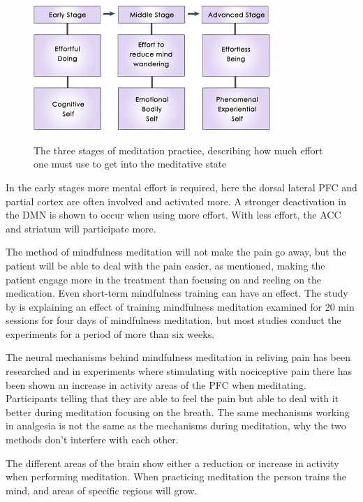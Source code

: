 \begin{figure}[H]
	\includegraphics[width=0.8\textwidth]{figures/stages_of_meditation.png} 
	\caption{The three stages of meditation practice, describing how much effort one must use to get into the meditative state}
	\label{fig:meditation_stages}  
	\cite{Tang2017}
\end{figure}  

In the early stages more mental effort is required, here the dorsal lateral PFC and partial cortex are often involved and activated more. A stronger deactivation in the DMN is shown to occur when using more effort. With less effort, the ACC and striatum will participate more. \cite{Tang2017}

The method of mindfulness meditation will not make the pain go away, but the patient will be able to deal with the pain easier, as mentioned, making the patient engage more in the treatment than focusing on and reeling on the medication. \cite{Jacob2016}
Even short-term mindfulness training can have an effect. The study by \cite{Zeidan2012} is explaining an effect of training mindfulness meditation examined for 20 min sessions for four days of mindfulness meditation, but most studies conduct the experiments for a period of more than six weeks. \cite{Zeidan2012}

The neural mechanisms behind mindfulness meditation in reliving pain has been researched and in experiments where stimulating with nociceptive pain there has been shown an increase in activity areas of the PFC when meditating. Participants telling that they are able to feel the pain but able to deal with it better during meditation focusing on the breath. 
The same mechanisms working in analgesia is not the same as the mechanisms during meditation, why the two methods don't interfere with each other. \cite{Jacob2016}

The different areas of the brain show either a reduction or increase in activity when performing meditation. When practicing meditation the person trains the mind, and areas of specific regions will grow. \cite{Zeidan2012}

